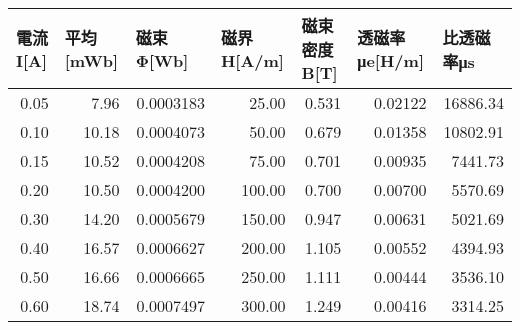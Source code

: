 \begin{tabular}{rrrrrrr}
\toprule
\multicolumn{1}{l}{電流I[A]} & \multicolumn{1}{l}{平均[mWb]} & \multicolumn{1}{l}{磁束Φ[Wb]} & \multicolumn{1}{l}{磁界H[A/m]} & \multicolumn{1}{l}{磁束密度B[T]} & \multicolumn{1}{l}{透磁率μe[H/m]} & \multicolumn{1}{l}{比透磁率μs} \\
\midrule
0.05  & 7.96  & 0.0003183 & 25.00 & 0.531 & 0.02122 & 16886.34 \\
0.10  & 10.18 & 0.0004073 & 50.00 & 0.679 & 0.01358 & 10802.91 \\
0.15  & 10.52 & 0.0004208 & 75.00 & 0.701 & 0.00935 & 7441.73 \\
0.20  & 10.50 & 0.0004200 & 100.00 & 0.700 & 0.00700 & 5570.69 \\
0.30  & 14.20 & 0.0005679 & 150.00 & 0.947 & 0.00631 & 5021.69 \\
0.40  & 16.57 & 0.0006627 & 200.00 & 1.105 & 0.00552 & 4394.93 \\
0.50  & 16.66 & 0.0006665 & 250.00 & 1.111 & 0.00444 & 3536.10 \\
0.60  & 18.74 & 0.0007497 & 300.00 & 1.249 & 0.00416 & 3314.25 \\
\bottomrule
\end{tabular}